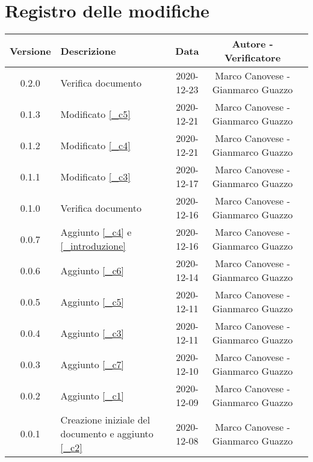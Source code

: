 \section*{Registro delle modifiche}

\begin{center}
	\begin{longtable}{|c|p{5cm}|c|c|c|}
	\hline
	\rowcolor{lighter-grayer}
	\textbf{Versione} & \textbf{Descrizione} & \textbf{Data} & \textbf{Autore - Verificatore}\\
	\hline
	\endfirsthead

	\hline
	0.2.0 & Verifica documento & 2020-12-23 & Marco Canovese - Gianmarco Guazzo\\
	0.1.3 & Modificato \ref{_c5} & 2020-12-21 & Marco Canovese - Gianmarco Guazzo\\
	0.1.2 & Modificato \ref{_c4} & 2020-12-21 & Marco Canovese - Gianmarco Guazzo\\
	0.1.1 & Modificato \ref{_c3} & 2020-12-17 & Marco Canovese - Gianmarco Guazzo\\
	0.1.0 & Verifica documento & 2020-12-16 & Marco Canovese - Gianmarco Guazzo\\
	0.0.7 & Aggiunto \ref{_c4} e \ref{_introduzione} & 2020-12-16 & Marco Canovese - Gianmarco Guazzo\\
	0.0.6 & Aggiunto \ref{_c6} & 2020-12-14 & Marco Canovese - Gianmarco Guazzo\\
	0.0.5 & Aggiunto \ref{_c5} & 2020-12-11 & Marco Canovese - Gianmarco Guazzo\\
	0.0.4 & Aggiunto \ref{_c3} & 2020-12-11 & Marco Canovese - Gianmarco Guazzo\\
	0.0.3 & Aggiunto \ref{_c7} & 2020-12-10 & Marco Canovese - Gianmarco Guazzo\\
	0.0.2 & Aggiunto \ref{_c1} & 2020-12-09 & Marco Canovese - Gianmarco Guazzo\\
    0.0.1 & Creazione iniziale del documento e aggiunto \ref{_c2} & 2020-12-08 & Marco Canovese - Gianmarco Guazzo\\
	\hline

	\end{longtable}
\end{center}
